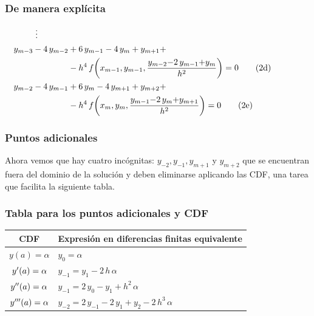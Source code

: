 \documentclass[12pt]{beamer}
\begin{document}
\begin{frame}
\frametitle{De manera explícita}
\begin{subequations}
\begin{align}
\vdots \nonumber \\
&{} \hspace*{-1cm} \begin{aligned}[b] 
y_{m-3} - 4 \, y_{m-2} &+ 6 \, y_{m-1} - 4 \, y_{m} + y_{m+1} + \\
&- h^{4} \, f \bigg( x_{m-1}, y_{m-1}, \dfrac{y_{m-2} {-} 2 \, y_{m-1} {+} y_{m}}{h^{2}} \bigg) = 0
\end{aligned}
\label{eq:ecuacion_08_13d} \tag{2d} \\
&{} \hspace*{-1cm} \begin{aligned}[b]
y_{m-2} - 4 \, y_{m-1} &+ 6 \, y_{m} - 4 \, y_{m+1} + y_{m+2} + \\
&- h^{4} \, f \bigg( x_{m}, y_{m}, \dfrac{y_{m-1} {-} 2 \, y_{m} {+} y_{m+1}}{h^{2}} \bigg) = 0
\end{aligned}
\label{eq:ecuacion_08_13e} \tag{2e}
\end{align} 
\end{subequations}
\end{frame}
\begin{frame}
\frametitle{Puntos adicionales}
Ahora vemos que hay cuatro incógnitas: $y_{-2}, y_{-1}, y_{m+1}$ y $y_{m+2}$ que se encuentran fuera del dominio de la solución y deben eliminarse aplicando las CDF, una tarea que facilita la siguiente tabla.
\end{frame}
\begin{frame}
\frametitle{Tabla para los puntos adicionales y CDF}
\begin{table}
\centering
\begin{tabular}{c | l}
CDF & Expresión en diferencias finitas equivalente \\ \hline
$y (a) = \alpha$ & $y_{0} = \alpha$ \\ \hline
${y}^{\prime} (a) = \alpha$ & $y_{-1} = y_{1} - 2 \, h \, \alpha$ \\ \hline
${y}^{\prime \prime} (a) = \alpha$ & $y_{-1} = 2 \, y_{0} - y_{1} + h^{2} \, \alpha$ \\ \hline
${y}^{\prime \prime \prime} (a) = \alpha$ & $y_{-2} = 2 \, y_{-1} - 2 \, y_{1} + y_{2} - 2 \, h^{3} \, \alpha$ \\ \hline
\end{tabular}
\end{table}
\end{frame}
\end{document}
